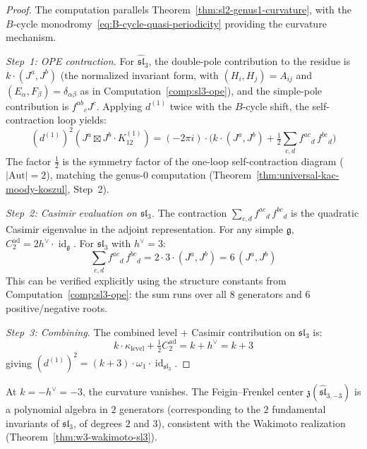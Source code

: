 \begin{proof}
The computation parallels Theorem~\ref{thm:sl2-genus1-curvature}, with the $B$-cycle monodromy~\eqref{eq:B-cycle-quasi-periodicity} providing the curvature mechanism.

\emph{Step~1: OPE contraction.}
For $\widehat{\mathfrak{sl}}_3$, the double-pole contribution to the residue is $k \cdot (J^a, J^b)$ (the normalized invariant form, with $(H_i, H_j) = A_{ij}$ and $(E_\alpha, F_\beta) = \delta_{\alpha\beta}$ as in Computation~\ref{comp:sl3-ope}), and the simple-pole contribution is $f^{ab}{}_{c} J^c$.  Applying $d^{(1)}$ twice with the $B$-cycle shift, the self-contraction loop yields:
\begin{equation}
(d^{(1)})^2(J^a \boxtimes J^b \cdot K^{(1)}_{12}) = (-2\pi i) \cdot \bigl(k \cdot (J^a, J^b) + \tfrac{1}{2}\textstyle\sum_{c,d} f^{ac}{}_{d}\, f^{bc}{}_{d}\bigr)
\end{equation}
The factor $\frac{1}{2}$ is the symmetry factor of the one-loop self-contraction diagram ($|\mathrm{Aut}| = 2$), matching the genus-0 computation (Theorem~\ref{thm:universal-kac-moody-koszul}, Step~2).

\emph{Step~2: Casimir evaluation on $\mathfrak{sl}_3$.}
The contraction $\sum_{c,d} f^{ac}{}_{d}\, f^{bc}{}_{d}$ is the quadratic Casimir eigenvalue in the adjoint representation.  For any simple $\mathfrak{g}$, $C_2^{\mathrm{ad}} = 2h^\vee \cdot \operatorname{id}_{\mathfrak{g}}$.  For $\mathfrak{sl}_3$ with $h^\vee = 3$:
\begin{equation}
\textstyle\sum_{c,d} f^{ac}{}_{d}\, f^{bc}{}_{d} = 2 \cdot 3 \cdot (J^a, J^b) = 6\,(J^a, J^b)
\end{equation}
This can be verified explicitly using the structure constants from Computation~\ref{comp:sl3-ope}: the sum runs over all $8$ generators and $6$ positive/negative roots.

\emph{Step~3: Combining.}
The combined level + Casimir contribution on $\mathfrak{sl}_3$ is:
\begin{equation}
k \cdot \kappa_{\mathrm{level}} + \tfrac{1}{2}C_2^{\mathrm{ad}} = k + h^\vee = k + 3
\end{equation}
giving $(d^{(1)})^2 = (k+3) \cdot \omega_1 \cdot \operatorname{id}_{\mathfrak{sl}_3}$.
\end{proof}

\begin{remark}
At $k = -h^\vee = -3$, the curvature vanishes.  The Feigin--Frenkel center $\mathfrak{z}(\widehat{\mathfrak{sl}}_{3,-3})$ is a polynomial algebra in $2$ generators (corresponding to the $2$ fundamental invariants of $\mathfrak{sl}_3$, of degrees $2$ and $3$), consistent with the Wakimoto realization (Theorem~\ref{thm:w3-wakimoto-sl3}).
\end{remark}

